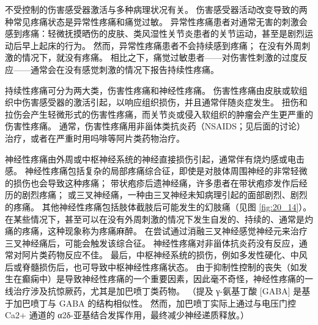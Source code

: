 不受控制的伤害感受器激活与多种病理状况有关。
伤害感受器活动改变导致的两种常见疼痛状态是异常性疼痛和痛觉过敏。 
异常性疼痛患者对通常无害的刺激会感到疼痛：轻微抚摸晒伤的皮肤、类风湿性关节炎患者的关节运动，甚至是剧烈运动后早上起床的行为。 
然而，异常性疼痛患者不会持续感到疼痛； 
在没有外周刺激的情况下，就没有疼痛。 
相比之下，痛觉过敏患者——对伤害性刺激的过度反应——通常会在没有感觉刺激的情况下报告持续性疼痛。


持续性疼痛可分为两大类，伤害性疼痛和神经性疼痛。 
伤害性疼痛由皮肤或软组织中伤害感受器的激活引起，以响应组织损伤，并且通常伴随炎症发生。 
扭伤和拉伤会产生轻微形式的伤害性疼痛，而关节炎或侵入软组织的肿瘤会产生更严重的伤害性疼痛。 
通常，伤害性疼痛用非甾体类抗炎药（NSAIDS；见后面的讨论）治疗，或者在严重时用吗啡等阿片类药物治疗。


神经性疼痛由外周或中枢神经系统的神经直接损伤引起，通常伴有烧灼感或电击感。 
神经性疼痛包括复杂的局部疼痛综合征，即使是对肢体周围神经的非常轻微的损伤也会导致这种疼痛； 
带状疱疹后遗神经痛，许多患者在带状疱疹发作后经历的剧烈疼痛； 
或三叉神经痛，一种由三叉神经未知病理引起的面部剧烈、剧烈的疼痛。 
其他神经性疼痛包括肢体截肢后可能发生的幻肢痛（见图 \ref{fig:20_14}）。 
在某些情况下，甚至可以在没有外周刺激的情况下发生自发的、持续的、通常是灼痛的疼痛，这种现象称为疼痛麻醉。 
在尝试通过消融三叉神经感觉神经元来治疗三叉神经痛后，可能会触发该综合征。 
神经性疼痛对非甾体抗炎药没有反应，通常对阿片类药物反应不佳。 
最后，中枢神经系统的损伤，例如多发性硬化、中风后或脊髓损伤后，也可导致中枢神经性疼痛状态。 
由于抑制性控制的丧失（如发生在癫痫中）是导致神经性疼痛的一个重要因素，因此毫不奇怪，神经性疼痛的一线治疗涉及抗惊厥药，尤其是加巴喷丁类药物。 
（提及 γ-氨基丁酸 [GABA] 是基于加巴喷丁与 GABA 的结构相似性。
然而，加巴喷丁实际上通过与电压门控 Ca2+ 通道的 α2δ-亚基结合发挥作用，最终减少神经递质释放。）

